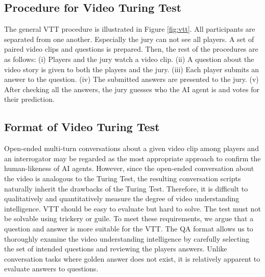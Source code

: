 \documentclass[letterpaper]{article} %
\begin{document}
\subsection{Procedure for Video Turing Test}
The general VTT procedure is illustrated in Figure \ref{fig:vtt}. All participants are separated from one another. Especially the jury can not see all players. A set of paired video clips and questions is prepared. Then, the rest of the procedures are as follows: (i) Players and the jury watch a video clip. (ii) A question about the video story is given to both the players and the jury. (iii) Each player submits an answer to the question. (iv) The submitted answers are presented to the jury. (v) After checking all the answers, the jury guesses who the AI agent is and votes for their prediction.

\subsection{Format of Video Turing Test}
Open-ended multi-turn conversations about a given video clip among players and an interrogator may be regarded as the most appropriate approach to confirm the human-likeness of AI agents. However, since the open-ended conversation about the video is analogous to the Turing Test, the resulting conversation scripts naturally inherit the drawbacks of the Turing Test. Therefore, it is difficult to qualitatively and quantitatively measure the degree of video understanding intelligence. 
VTT should be easy to evaluate but hard to solve. The test must not be solvable using trickery or guile. To meet these requirements, we argue that a question and answer is more suitable for the VTT. The QA format allows us to thoroughly examine the video understanding intelligence by carefully selecting the set of intended questions and reviewing the players answers. Unlike conversation tasks where golden answer does not exist, it is relatively apparent to evaluate answers to questions. 
\end{document}
